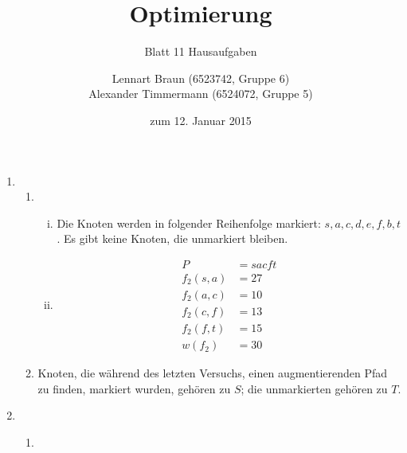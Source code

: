 \documentclass[a4paper]{scrartcl}
\title{Optimierung}
\subtitle{Blatt 11 Hausaufgaben}
\author{
	Lennart Braun (6523742, Gruppe 6) \\
    Alexander Timmermann (6524072, Gruppe 5)
}
\date{zum 12. Januar 2015}
\begin{document}
\maketitle

\begin{enumerate}[label=\bfseries\arabic*.]
    \item
        \begin{enumerate}
            \item
                \begin{enumerate}[(i)]
                    \item
                        Die Knoten werden in folgender Reihenfolge markiert:
                        $s, a, c, d, e, f, b, t$.
                        Es gibt keine Knoten, die unmarkiert bleiben.

                    \item
                        \begin{align}
                            P &= sacft \\
                            f_2(s,a) &= 27 \\
                            f_2(a, c) &= 10 \\
                            f_2(c, f) &= 13 \\
                            f_2(f, t) &= 15 \\
                            w(f_2) &= 30
                        \end{align}

                \end{enumerate}

            \item
                Knoten, die während des letzten Versuchs, einen augmentierenden
                Pfad zu finden, markiert wurden, gehören zu $S$; die
                unmarkierten gehören zu $T$.

        \end{enumerate}

    \item
        \begin{enumerate}
            \item \hfill \\
                \begin{figure}[h]
                    \centering
\end{figure}
\end{enumerate}
\end{enumerate}
\end{document}

